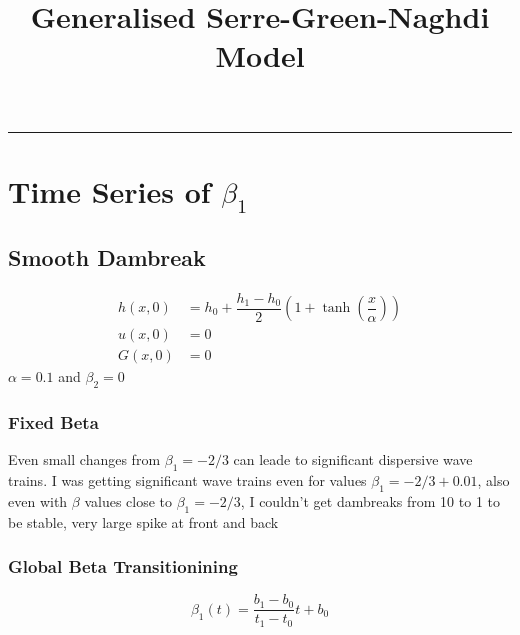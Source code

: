 \documentclass[10pt]{article}
\title{Generalised Serre-Green-Naghdi Model}
\begin{document}
\maketitle

\vspace{-0.3in}
\noindent
\rule{\linewidth}{0.4pt}


\section{Time Series of $\beta_1$ }


\subsection{Smooth Dambreak}

\begin{align}
h(x,0) & = h_0 + \dfrac{h_1 - h_0}{2} \left(1 + \tanh\left(\dfrac{x}{\alpha}\right)\right)  \\
u(x,0) &= 0 \\
G(x,0) &= 0
\end{align}
$\alpha = 0.1$ and $\beta_2 = 0$

\subsubsection{Fixed Beta}
Even small changes from $\beta_1 = -2/3$ can leade to significant dispersive wave trains. I was getting significant wave trains even for values $\beta_1 = -2/3 + 0.01 $, also even with $\beta$ values close to $\beta_1 =-2/3$, I couldn't get dambreaks from 10 to 1 to be stable, very large spike at front and back


\subsubsection{Global Beta Transitionining}
\begin{equation}
\beta_1(t) = \dfrac{b_1 - b_0}{t_1 - t_0} t + b_0
\end{equation}
\end{document}
